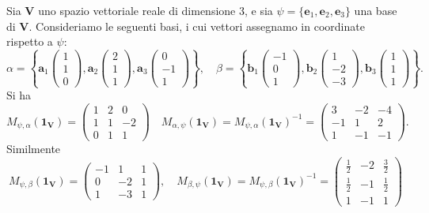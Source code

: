 \documentclass{article}
\theoremstyle{plain}
\theoremstyle{definition}
\theoremstyle{remark}
\begin{document}
\vspace{10pt}

Sia $\mathbf{V}$ uno spazio vettoriale reale di dimensione 3, e sia $\psi = \{\mathbf{e}_1, \mathbf{e}_2, \mathbf{e}_3\}$ una base di $\mathbf{V}$. 
Consideriamo le seguenti basi, i cui vettori assegnamo in coordinate rispetto a $\psi$:
\[\alpha = \left\{\mathbf{a}_1\begin{pmatrix}1\\1\\0\end{pmatrix}, \mathbf{a}_2\begin{pmatrix}2\\1\\1\end{pmatrix}, \mathbf{a}_3\begin{pmatrix}0\\-1\\1\end{pmatrix}\right\},\quad \beta = \left\{\mathbf{b}_1\begin{pmatrix}-1\\0\\1\end{pmatrix}, \mathbf{b}_2\begin{pmatrix}1\\-2\\-3\end{pmatrix}, \mathbf{b}_3\begin{pmatrix}1\\1\\1\end{pmatrix}\right\}.\]
Si ha
\[M_{\psi,\alpha}(\mathbf{1_V}) = \begin{pmatrix} 1 & 2 & 0 \\ 1 & 1 & -2 \\ 0 & 1 & 1 \end{pmatrix} \quad M_{\alpha,\psi}(\mathbf{1_V}) = M_{\psi,\alpha}(\mathbf{1_V})^{-1} = \begin{pmatrix} 3 & -2 & -4 \\ -1 & 1 & 2 \\ 1 & -1 & -1 \end{pmatrix}.\]
Similmente
\[M_{\psi,\beta}(\mathbf{1_V}) = \begin{pmatrix} -1 & 1 & 1 \\ 0 & -2 & 1 \\ 1 & -3 & 1 \end{pmatrix},\quad M_{\beta,\psi}(\mathbf{1_V}) = M_{\psi,\beta}(\mathbf{1_V})^{-1} = \begin{pmatrix} \frac{1}{2} & -2 & \frac{3}{2} \\ \frac{1}{2} & -1 & \frac{1}{2} \\ 1 & -1 & 1 \end{pmatrix}\]
\end{document}
